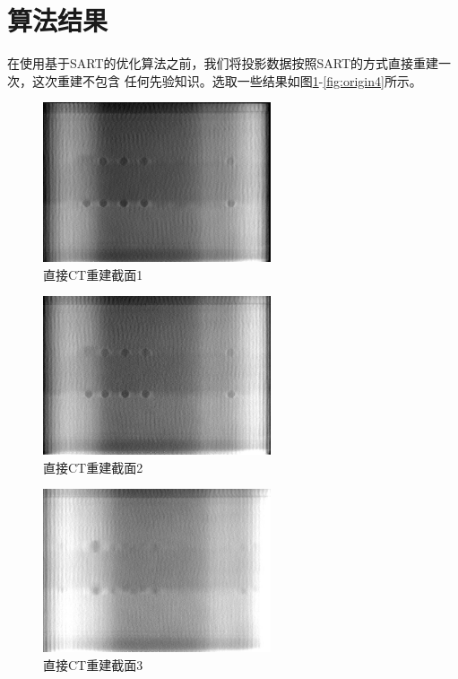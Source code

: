 \section{算法结果}
在使用基于SART的优化算法之前，我们将投影数据按照SART的方式直接重建一次，这次重建不包含
任何先验知识。选取一些结果如图\ref{fig:origin1}-\ref{fig:origin4}所示。
\begin{figure}[!ht]\label{fig:origin1}
\center
\includegraphics[width=0.6\textwidth]{figure/result/origin1.jpg}
\caption{直接CT重建截面1}
\end{figure}
\begin{figure}[!ht]\label{fig:origin2}
\center
\includegraphics[width=0.6\textwidth]{figure/result/origin2.jpg}
\caption{直接CT重建截面2}
\end{figure}
\begin{figure}[!ht]\label{fig:origin3}
\center
\includegraphics[width=0.6\textwidth]{figure/result/origin3.jpg}
\caption{直接CT重建截面3}
\end{figure}
